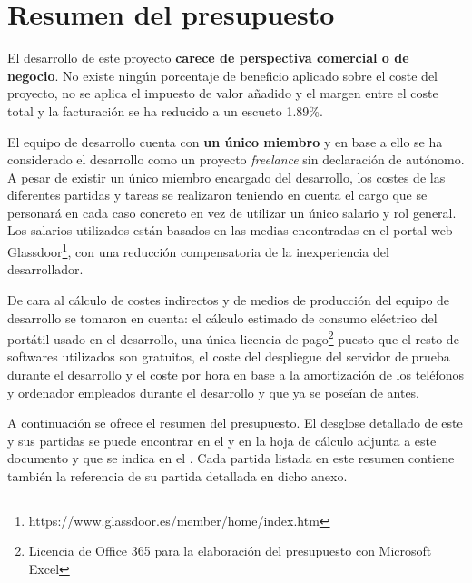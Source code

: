 \chapter{Resumen del presupuesto}
\label{ch:resumen_presupuesto}

El desarrollo de este proyecto \textbf{carece de perspectiva comercial o de negocio}. No existe ningún porcentaje de beneficio aplicado sobre el coste del proyecto, no se aplica el impuesto de valor añadido y el margen entre el coste total y la facturación se ha reducido a un escueto 1.89\%.

El equipo de desarrollo cuenta con \textbf{un único miembro} y en base a ello se ha considerado el desarrollo como un proyecto \emph{freelance} sin declaración de autónomo. A pesar de existir un único miembro encargado del desarrollo, los costes de las diferentes partidas y tareas se realizaron teniendo en cuenta el cargo que se personará en cada caso concreto en vez de utilizar un único salario y rol general. Los salarios utilizados están basados en las medias encontradas en el portal web Glassdoor\footnote{https://www.glassdoor.es/member/home/index.htm}, con una reducción compensatoria de la inexperiencia del desarrollador.

De cara al cálculo de costes indirectos y de medios de producción del equipo de desarrollo se tomaron en cuenta: el cálculo estimado de consumo eléctrico del portátil usado en el desarrollo, una única licencia de pago\footnote{Licencia de Office 365 para la elaboración del presupuesto con Microsoft Excel} puesto que el resto de softwares utilizados son gratuitos, el coste del despliegue del servidor de prueba durante el desarrollo y el coste por hora en base a la amortización de los teléfonos y ordenador empleados durante el desarrollo y que ya se poseían de antes.

A continuación se ofrece el resumen del presupuesto. El desglose detallado de este y sus partidas se puede encontrar en el   y en la hoja de cálculo adjunta a este documento y que se indica en el . Cada partida listada en este resumen contiene también la referencia de su partida detallada en dicho anexo.


